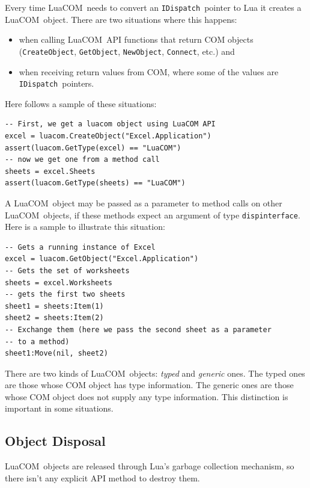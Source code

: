 \documentclass[11pt,a4paper,english]{report}
\newcommand{\ident}[1]{\mbox{\texttt{#1}}}
\newcommand{\techname}[1]{\mbox{#1}}
\newcommand{\luacom}{\techname{LuaCOM}}
\newcommand{\idispatch}{\ident{IDispatch}}
\newcommand{\dispinterface}{\ident{dispinterface}}
\begin{document}
Every time \luacom\ needs to convert an \idispatch\ pointer to Lua it
creates a \luacom\ object. There are two situations where this
happens:

\begin{itemize}
\item when calling \luacom\ API functions that return COM objects
(\ident{CreateObject}, \ident{GetObject}, \ident{NewObject},
\ident{Connect}, etc.) and
\item when receiving return values from COM, where some of the values
are \idispatch\ pointers.
\end{itemize}

Here follows a sample of these situations:

\begin{verbatim}
-- First, we get a luacom object using LuaCOM API
excel = luacom.CreateObject("Excel.Application")
assert(luacom.GetType(excel) == "LuaCOM")
-- now we get one from a method call
sheets = excel.Sheets
assert(luacom.GetType(sheets) == "LuaCOM")
\end{verbatim}

A \luacom\ object may be passed as a parameter to method calls on
other \luacom\ objects, if these methods expect an argument of type
\dispinterface. Here is a sample to illustrate this situation:

\begin{verbatim}
-- Gets a running instance of Excel
excel = luacom.GetObject("Excel.Application")
-- Gets the set of worksheets
sheets = excel.Worksheets
-- gets the first two sheets
sheet1 = sheets:Item(1)
sheet2 = sheets:Item(2)
-- Exchange them (here we pass the second sheet as a parameter
-- to a method)
sheet1:Move(nil, sheet2)
\end{verbatim}


There are two kinds of \luacom\ objects: \emph{typed} and
\emph{generic} ones. The typed ones are those whose COM object has
type information. The generic ones are those whose COM object does not
supply any type information. This distinction is important in some
situations.



\subsection{Object Disposal}
\label{sec:object-disposal}

\luacom\ objects are released through Lua's garbage collection
mechanism, so there isn't any explicit API method to destroy them.
\end{document}
